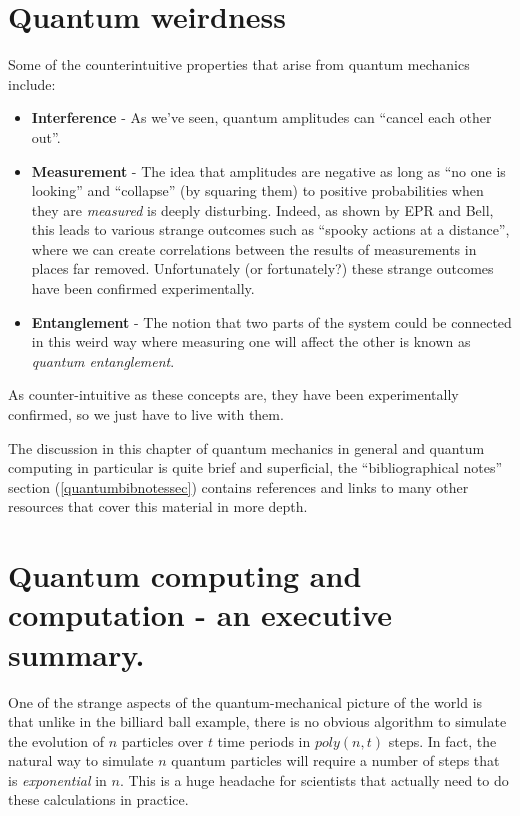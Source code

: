 \section{Quantum weirdness}\label{Quantum-weirdness}

Some of the counterintuitive properties that arise from quantum
mechanics include:

\begin{itemize}
\item
  \textbf{Interference} - As we've seen, quantum amplitudes can ``cancel
  each other out''.
\item
  \textbf{Measurement} - The idea that amplitudes are negative as long
  as ``no one is looking'' and ``collapse'' (by squaring them) to
  positive probabilities when they are \emph{measured} is deeply
  disturbing. Indeed, as shown by EPR and Bell, this leads to various
  strange outcomes such as ``spooky actions at a distance'', where we
  can create correlations between the results of measurements in places
  far removed. Unfortunately (or fortunately?) these strange outcomes
  have been confirmed experimentally.
\item
  \textbf{Entanglement} - The notion that two parts of the system could
  be connected in this weird way where measuring one will affect the
  other is known as \emph{quantum entanglement}.
\end{itemize}

As counter-intuitive as these concepts are, they have been
experimentally confirmed, so we just have to live with them.

The discussion in this chapter of quantum mechanics in general and
quantum computing in particular is quite brief and superficial, the
``bibliographical notes'' section (\cref{quantumbibnotessec}) contains
references and links to many other resources that cover this material in
more depth.

\section{Quantum computing and computation - an executive
summary.}\label{Quantum-computing-and-com}

One of the strange aspects of the quantum-mechanical picture of the
world is that unlike in the billiard ball example, there is no obvious
algorithm to simulate the evolution of \(n\) particles over \(t\) time
periods in \(poly(n,t)\) steps. In fact, the natural way to simulate
\(n\) quantum particles will require a number of steps that is
\emph{exponential} in \(n\). This is a huge headache for scientists that
actually need to do these calculations in practice.

